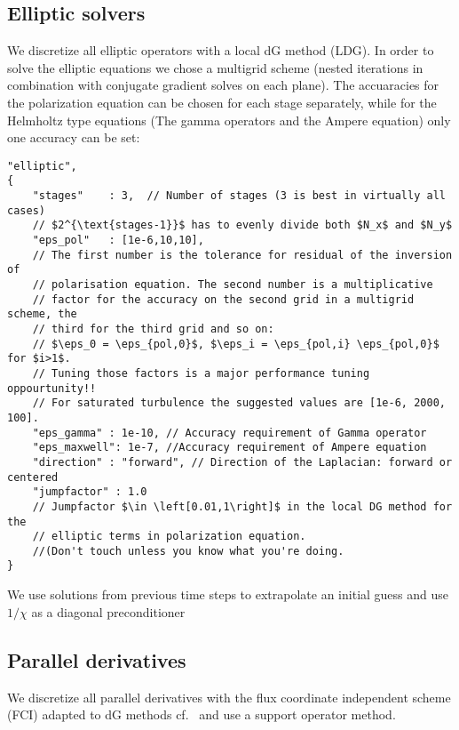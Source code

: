 \subsection{Elliptic solvers}
We discretize all elliptic operators with a local dG method (LDG).  In order to
solve the elliptic equations we chose a multigrid scheme (nested iterations in
combination with conjugate gradient solves on each plane). The accuaracies for
the polarization equation can be chosen for each stage separately, while for
the Helmholtz type equations (The gamma operators and the Ampere equation) only
one accuracy can be set:
\begin{verbatim}
"elliptic",
{
    "stages"    : 3,  // Number of stages (3 is best in virtually all cases)
    // $2^{\text{stages-1}}$ has to evenly divide both $N_x$ and $N_y$
    "eps_pol"   : [1e-6,10,10],
    // The first number is the tolerance for residual of the inversion of
    // polarisation equation. The second number is a multiplicative
    // factor for the accuracy on the second grid in a multigrid scheme, the
    // third for the third grid and so on:
    // $\eps_0 = \eps_{pol,0}$, $\eps_i = \eps_{pol,i} \eps_{pol,0}$  for $i>1$.
    // Tuning those factors is a major performance tuning oppourtunity!!
    // For saturated turbulence the suggested values are [1e-6, 2000, 100].
    "eps_gamma" : 1e-10, // Accuracy requirement of Gamma operator
    "eps_maxwell": 1e-7, //Accuracy requirement of Ampere equation
    "direction" : "forward", // Direction of the Laplacian: forward or centered
    "jumpfactor" : 1.0
    // Jumpfactor $\in \left[0.01,1\right]$ in the local DG method for the
    // elliptic terms in polarization equation.
    //(Don't touch unless you know what you're doing.
}
\end{verbatim}
\begin{tcolorbox}[title=Note]
    We use solutions from previous time steps to extrapolate an initial guess
    and use $1/\chi$ as a diagonal preconditioner
\end{tcolorbox}
\subsection{Parallel derivatives}
We discretize all parallel derivatives with the
flux coordinate independent scheme (FCI) adapted to dG methods
cf.~\cite{Held2016,Stegmeir2017}
and use a support operator method.

